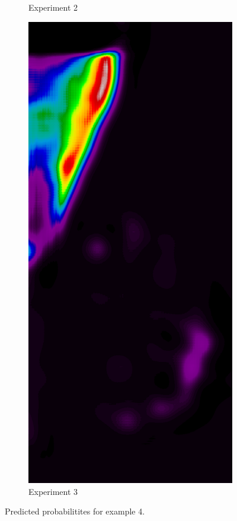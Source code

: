 \begin{figure}[h!]
\begin{subfigure}{0.195\textwidth}
		\caption{Experiment 2}
    \end{subfigure}
    \begin{subfigure}{0.195\textwidth}
		\centering
			\includegraphics[width=\textwidth]{plots/examples/example4_probs_3.png}
		\caption{Experiment 3}
    \end{subfigure}
	\caption[Predictions for example 4]{Predicted probabilitites for example 4.}
\end{figure}


